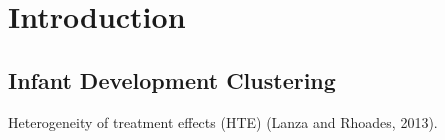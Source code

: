 \documentclass[useAMS,referee]{biom}
\begin{document}

\maketitle

\setcounter{tocdepth}{3}
\tableofcontents

\newpage


%

\section{Introduction}
\label{s:intro}

\subsection{Infant Development Clustering}

Heterogeneity of treatment effects (HTE) (Lanza and Rhoades, 2013). 
\end{document}
